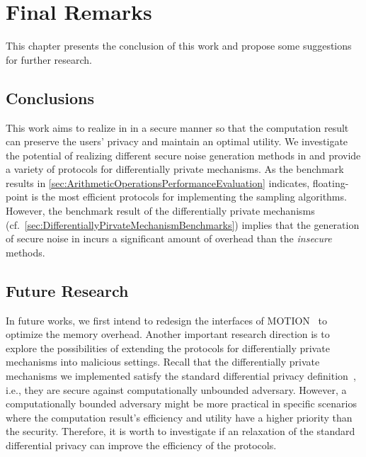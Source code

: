 \chapter{Final Remarks}
\label{cha:FinalRemarks}

This chapter presents the conclusion of this work and propose some suggestions for further research.

\section{Conclusions}
\label{sec:Conclusions}

This work aims to realize \differentialprivacy in \smpc in a secure manner so that the computation result can preserve the users' privacy and maintain an optimal utility. We investigate the potential of realizing different secure noise generation methods in \smpc and provide a variety of \smpc protocols for differentially private mechanisms. As the benchmark results in \autoref{sec:ArithmeticOperationsPerformanceEvaluation} indicates, \booleanGMW floating-point is the most efficient \smpc protocols for implementing the sampling algorithms. However, the benchmark result of the differentially private mechanisms (cf.~\autoref{sec:DifferentiallyPirvateMechanismBenchmarks}) implies that the generation of secure noise in \smpc incurs a significant amount of overhead than the \textit{insecure} methods. 


\section{Future Research}
\label{sec:Conclusions}
In future works, we first intend to redesign the interfaces of MOTION~\cite{braun2022motion} to optimize the memory overhead.
Another important research direction is to explore the possibilities of extending the \smpc protocols for differentially private mechanisms into malicious settings.
Recall that the differentially private mechanisms we implemented satisfy the standard differential privacy definition~\cite{dwork2006differential, dwork2006calibrating}, i.e., they are secure against computationally unbounded adversary.
However, a computationally bounded adversary might be more practical in specific scenarios where the computation result's efficiency and utility have a higher priority than the security.
Therefore, it is worth to investigate if an relaxation of the standard differential privacy can improve the efficiency of the \smpc protocols.




